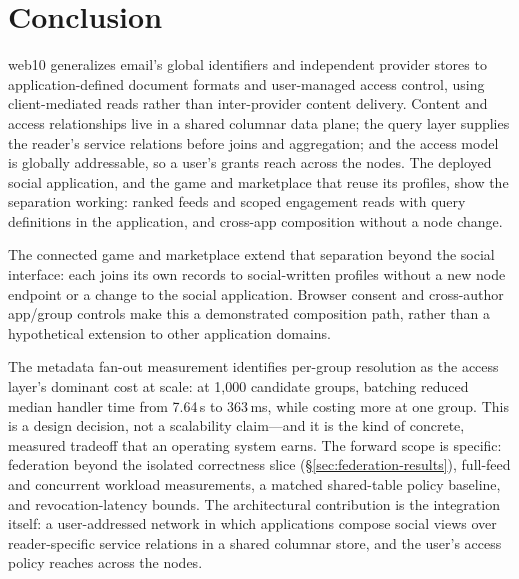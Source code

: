 \documentclass[sigconf, nonacm]{acmart}
\begin{document}
\section{Conclusion}
\label{sec:concl}

web10 generalizes email's global identifiers and independent provider stores
to application-defined document formats and user-managed access control,
using client-mediated reads rather than inter-provider content delivery. Content and access
relationships live in a shared columnar data plane; the query layer supplies
the reader's service relations before joins and aggregation; and the access
model is globally addressable, so a user's grants reach across the nodes. The
deployed social application, and the game and marketplace that reuse its
profiles, show the separation working: ranked feeds and scoped engagement
reads with query definitions in the application, and cross-app composition
without a node change.

The connected game and marketplace extend that separation beyond the social
interface: each joins its own records to social-written profiles without a new
node endpoint or a change to the social application. Browser consent and
cross-author app/group controls make this a demonstrated composition path,
rather than a hypothetical extension to other application domains.

The metadata fan-out measurement identifies per-group resolution as the access
layer's dominant cost at scale: at 1,000 candidate groups, batching reduced
median handler time from 7.64\,s to 363\,ms, while costing more at one group.
This is a design decision, not a scalability claim---and it is the kind of
concrete, measured tradeoff that an operating system earns. The forward scope
is specific: federation beyond the isolated correctness slice
(\S\ref{sec:federation-results}), full-feed and concurrent workload measurements, a
matched shared-table policy baseline, and revocation-latency bounds. The
architectural contribution is the integration itself: a user-addressed network
in which applications compose social views over reader-specific service
relations in a shared columnar store, and the user's access policy reaches
across the nodes.



\end{document}
